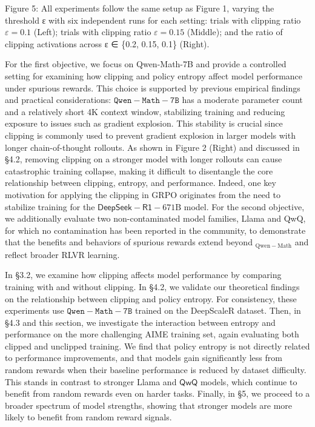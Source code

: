 \documentclass[
  10
]{article}
\begin{document}
Figure 5: All experiments follow the same setup as Figure 1, varying the
threshold ε with six independent runs for each setting: trials with
clipping ratio \(\varepsilon = 0 . 1\) (Left); trials with clipping
ratio \(\varepsilon = 0 . 1 5\) (Middle); and the ratio of clipping
activations across ε ∈ \{0.2, 0.15, 0.1\} (Right).

For the first objective, we focus on Qwen-Math-7B and provide a
controlled setting for examining how clipping and policy entropy affect
model performance under spurious rewards. This choice is supported by
previous empirical findings and practical considerations:
\(\mathtt { Q w e n - M a t h - 7 B }\) has a moderate parameter count
and a relatively short 4K context window, stabilizing training and
reducing exposure to issues such as gradient explosion. This stability
is crucial since clipping is commonly used to prevent gradient explosion
in larger models with longer chain-of-thought rollouts. As shown in
Figure 2 (Right) and discussed in §4.2, removing clipping on a stronger
model with longer rollouts can cause catastrophic training collapse,
making it difficult to disentangle the core relationship between
clipping, entropy, and performance. Indeed, one key motivation for
applying the clipping in GRPO originates from the need to stabilize
training for the
\(\mathsf { D e e p S e e k - R 1 } - 6 7 1 \mathrm { B }\) model. For
the second objective, we additionally evaluate two non-contaminated
model families, Llama and QwQ, for which no contamination has been
reported in the community, to demonstrate that the benefits and
behaviors of spurious rewards extend beyond
\(_ { \mathrm { Q w e n - M a t h } }\) and reflect broader RLVR
learning.

In §3.2, we examine how clipping affects model performance by comparing
training with and without clipping. In §4.2, we validate our theoretical
findings on the relationship between clipping and policy entropy. For
consistency, these experiments use
\(\mathtt { Q w e n - M a t h - 7 B }\) trained on the DeepScaleR
dataset. Then, in §4.3 and this section, we investigate the interaction
between entropy and performance on the more challenging AIME training
set, again evaluating both clipped and unclipped training. We find that
policy entropy is not directly related to performance improvements, and
that models gain significantly less from random rewards when their
baseline performance is reduced by dataset difficulty. This stands in
contrast to stronger Llama and \(\mathsf { Q w Q }\) models, which
continue to benefit from random rewards even on harder tasks. Finally,
in §5, we proceed to a broader spectrum of model strengths, showing that
stronger models are more likely to benefit from random reward signals.
\end{document}
